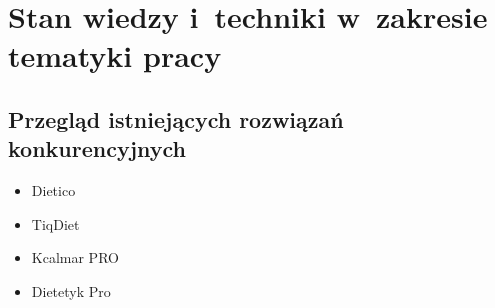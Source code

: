 \chapter{Stan wiedzy i~techniki w~zakresie tematyki pracy}\label{ch:knowladge-state}
\section{Przegląd istniejących rozwiązań konkurencyjnych}\label{sec:competitive-solutions}
\begin{itemize}
    \item Dietico
    \item TiqDiet
    \item Kcalmar PRO
    \item Dietetyk Pro
\end{itemize}

